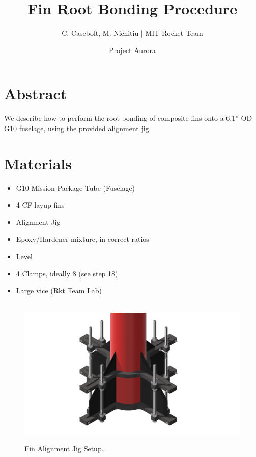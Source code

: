 \documentclass{amsdtx}
\title{\sc Fin Root Bonding Procedure}
\author{\sc C. Casebolt, M. Nichitiu | MIT Rocket Team}
\date{\sc Project Aurora}
\begin{document}
\maketitle    
\section{Abstract}
We describe how to perform the root bonding of composite fins onto a 6.1'' OD G10 fuselage, using the provided alignment jig.
\section{Materials}
\begin{itemize}
	\item G10 Mission Package Tube (Fuselage)
	\item 4 CF-layup fins
	\item Alignment Jig
	\item Epoxy/Hardener mixture, in correct ratios
	\item Level
	\item 4 Clamps, ideally 8 (see step 18)
	\item Large vice (Rkt Team Lab)
\end{itemize}
\begin{figure}[H]
\centering
~\kern-0.5cm\includegraphics[scale=0.3]{render.png}
\caption{Fin Alignment Jig Setup.}	
\end{figure}
\end{document}
